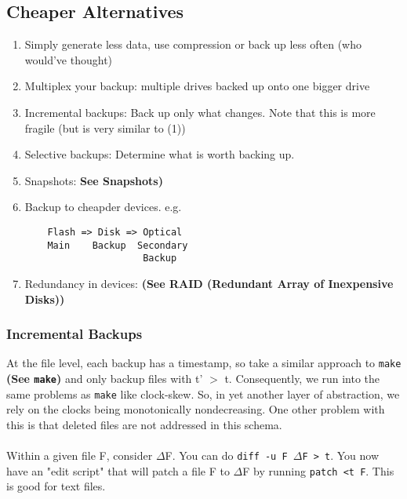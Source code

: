 \documentclass[13pt]{article}
\begin{document}
\subsection{Cheaper Alternatives}
\begin{enumerate}[label=(\arabic*)]
\item Simply generate less data, use compression or back up less often (who would've thought)
\item Multiplex your backup: multiple drives backed up onto one bigger drive
\item Incremental backups: Back up only what changes. Note that this is more fragile (but is very similar to (1))
\item Selective backups: Determine what is worth backing up.
\item Snapshots: \textbf{See Snapshots)}
\item Backup to cheapder devices. e.g.
\begin{verbatim}
    Flash => Disk => Optical
    Main    Backup  Secondary
                     Backup
\end{verbatim}
\item Redundancy in devices: \textbf{(See RAID (Redundant Array of Inexpensive Disks))}
\end{enumerate}

\subsubsection{Incremental Backups}
At the file level, each backup has a timestamp, so take a similar approach to \texttt{make} \textbf{(See \texttt{make})} and only backup files with t' $>$ t. Consequently, we run into the same problems as \texttt{make} like clock-skew. So, in yet another layer of abstraction, we rely on the clocks being monotonically nondecreasing. One other problem with this is that deleted files are not addressed in this schema. \\ \\
Within a given file F, consider $\Delta$F. You can do \texttt{diff -u F $\Delta$F > t}. You now have an "edit script" that will patch a file F to $\Delta$F by running \texttt{patch <t F}. This is good for text files.
\end{document}
